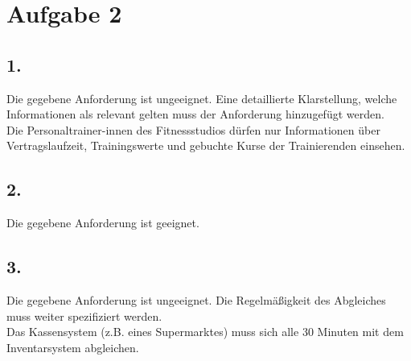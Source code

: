 \chapter*{Aufgabe 2}
\section*{1.}
    Die gegebene Anforderung ist ungeeignet. Eine detaillierte Klarstellung, welche Informationen als relevant gelten muss der Anforderung hinzugefügt werden. \\
    Die Personaltrainer-innen des Fitnessstudios dürfen nur Informationen über Vertragslaufzeit, Trainingswerte und gebuchte Kurse der Trainierenden
    einsehen.
\section*{2.}
    Die gegebene Anforderung ist geeignet.
\section*{3.}
   Die gegebene Anforderung ist ungeeignet. Die Regelmäßigkeit des Abgleiches muss weiter spezifiziert werden. \\
   Das Kassensystem (z.B. eines Supermarktes) muss sich alle 30 Minuten mit dem Inventarsystem abgleichen.